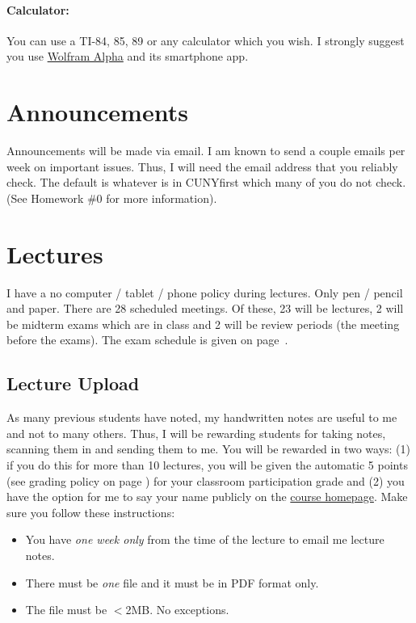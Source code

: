 \documentclass[12pt]{article}
\newcommand{\coursewebpage}{\href{https://github.com/kapelner/QC_Math_341_Spring_2019}{course homepage}}
\begin{document}
\paragraph{Calculator:} You can use a TI-84, 85, 89 or any calculator which you wish. I strongly suggest you use \href{http://www.wolframalpha.com/}{Wolfram Alpha} and its smartphone app.

\section*{Announcements}

Announcements will be made via email. I am known to send a couple emails per week on important issues. Thus, I will need the email address that you reliably check. The default is whatever is in CUNYfirst which many of you do not check. (See Homework \#0 for more information).

\section*{Lectures}

I have a no computer / tablet / phone policy during lectures. Only pen / pencil and paper. There are 28 scheduled meetings. Of these, 23 will be lectures, 2 will be midterm exams which are in class and 2 will be review periods (the meeting before the exams). The exam schedule is given on page~\pageref{subsec:exam_schedule}.

\subsection*{Lecture Upload}

As many previous students have noted, my handwritten notes are useful to me and not to many others. Thus, I will be rewarding students for taking notes, scanning them in and sending them to me. You will be rewarded in two ways: (1) if you do this for more than 10 lectures, you will be given the automatic 5 points (see grading policy on page \pageref{sec:grading}) for your classroom participation grade and (2) you have the option for me to say your name publicly on the \coursewebpage. Make sure you follow these instructions:

\begin{itemize}
\item You have \emph{one week only} from the time of the lecture to email me lecture notes.
\item There must be \emph{one} file and it must be in PDF format only.
\item The file must be $<$2MB. No exceptions.
\end{itemize}
\end{document}
